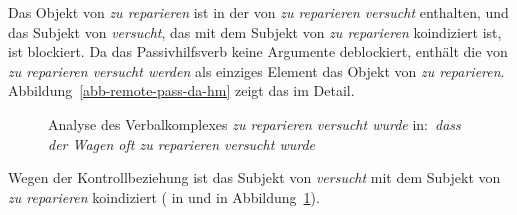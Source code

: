 {\noindent
Das Objekt von \emph{zu reparieren} ist in der \compsl von \emph{zu reparieren versucht} enthalten,
und das Subjekt von \emph{versucht}, das mit dem Subjekt von \emph{zu reparieren} koindiziert ist, ist blockiert.
Da das Passivhilfsverb keine Argumente deblockiert, enthält die \compsl von \emph{zu reparieren versucht werden}
als einziges Element das Objekt von \emph{zu reparieren}.
Abbildung~\vref{abb-remote-pass-da-hm} zeigt das im Detail.
\begin{figure}
\caption{Analyse des Verbalkomplexes \emph{zu reparieren versucht wurde} in:\ \emph{dass der Wagen oft zu reparieren versucht wurde}}\label{abb-remote-pass-da-hm}
\end{figure}
Wegen der Kontrollbeziehung ist das Subjekt von \emph{versucht} mit dem Subjekt von \emph{zu reparieren} koindiziert (
in  und  in Abbildung~\ref{abb-remote-pass-da-hm}).
}
